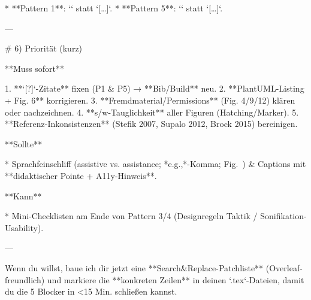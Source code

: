* **Pattern 1**: `\cite{Austin2024PreTeXt,Seo2019RMarkdown,CervoneSorge2019W4A,Armano2018LaTeXPDF}` statt `[…]`. 
* **Pattern 5**: `\cite{Leotta2023AutoCaptioning,Edwards2023AltTextProcess,Jung2021AltText}` statt `[…]`. 

---

# 6) Priorität (kurz)

**Muss sofort**

1. **`[?]`-Zitate** fixen (P1 & P5) → **Bib/Build** neu. 
2. **PlantUML-Listing + Fig. 6** korrigieren. 
3. **Fremdmaterial/Permissions** (Fig. 4/9/12) klären oder nachzeichnen. 
4. **s/w-Tauglichkeit** aller Figuren (Hatching/Marker). 
5. **Referenz-Inkonsistenzen** (Stefik 2007, Supalo 2012, Brock 2015) bereinigen. 

**Sollte**

* Sprachfeinschliff (assistive vs. assistance; *e.g.,*-Komma; Fig.~) & Captions mit **didaktischer Pointe + A11y-Hinweis**. 

**Kann**

* Mini-Checklisten am Ende von Pattern 3/4 (Designregeln Taktik / Sonifikation-Usability). 

---

Wenn du willst, baue ich dir jetzt eine **Search&Replace-Patchliste** (Overleaf-freundlich) und markiere die **konkreten Zeilen** in deinen `.tex`-Dateien, damit du die 5 Blocker in <15 Min. schließen kannst.
